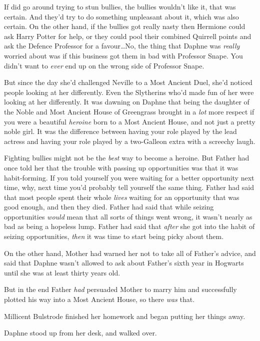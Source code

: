 If \SPHEW did go around trying to stun bullies, the bullies wouldn't like
it, that was certain. And they'd try to do something unpleasant about it, which
was also certain. On the other hand, if the bullies got really nasty then
Hermione could ask Harry Potter for help, or they could pool their combined
Quirrell points and ask the Defence Professor for a favour…No, the thing
that Daphne was \emph{really} worried about was if this business got them in
bad with Professor Snape. You didn't want to \emph{ever} end up on the wrong
side of Professor Snape.

But since the day she'd challenged Neville to a Most Ancient Duel, she'd
noticed people looking at her differently. Even the Slytherins who'd made fun
of her were looking at her differently. It was dawning on Daphne that being the
daughter of the Noble and Most Ancient House of Greengrass brought in a
\emph{lot} more respect if you were a beautiful \emph{heroine} born to a Most
Ancient House, and not just a pretty noble girl. It was the difference between
having your role played by the lead actress and having your role played by a
two-Galleon extra with a screechy laugh.

Fighting bullies might not be the \emph{best} way to become a heroine. But
Father had once told her that the trouble with passing up opportunities was
that it was habit-forming. If you told yourself you were waiting for a better
opportunity next time, why, next time you'd probably tell yourself the same
thing. Father had said that most people spent their whole \emph{lives} waiting
for an opportunity that was good enough, and then they died. Father had said
that while seizing opportunities \emph{would} mean that all sorts of things
went wrong, it wasn't nearly as bad as being a hopeless lump. Father had said
that \emph{after} she got into the habit of seizing opportunities, \emph{then}
it was time to start being picky about them.

On the other hand, Mother had warned her not to take all of Father's advice,
and said that Daphne wasn't allowed to ask about Father's sixth year in
Hogwarts until she was at least thirty years old.

But in the end Father \emph{had} persuaded Mother to marry him and successfully
plotted his way into a Most Ancient House, so there \emph{was} that.

Millicent Bulstrode finished her homework and began putting her things away.

Daphne stood up from her desk, and walked over.

